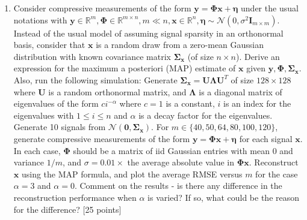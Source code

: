\documentclass[11pt]{article}
\begin{document}
\begin{enumerate}
\item Consider compressive measurements of the form $\boldsymbol{y} = \boldsymbol{\Phi x} + \boldsymbol{\eta}$ under the usual notations with $\boldsymbol{y} \in \mathbb{R}^m, \boldsymbol{\Phi} \in \mathbb{R}^{m \times n}, m \ll n, \boldsymbol{x} \in \mathbb{R}^n, \boldsymbol{\eta} \sim \mathcal{N}(0,\sigma^2\boldsymbol{I}_{m \times m})$. Instead of the usual model of assuming signal sparsity in an orthonormal basis, consider that $\boldsymbol{x}$ is a random draw from a zero-mean Gaussian distribution with known covariance matrix $\boldsymbol{\Sigma_x}$ (of size $n \times n$). Derive an expression for the maximum a posteriori (MAP) estimate of $\boldsymbol{x}$ given $\boldsymbol{y}, \boldsymbol{\Phi}, \boldsymbol{\Sigma_x}$. Also, run the following simulation:
Generate $\boldsymbol{\Sigma_x} = \boldsymbol{U \Lambda U}^T$ of size $128 \times 128$ where $\boldsymbol{U}$ is a random orthonormal matrix, and $\boldsymbol{\Lambda}$ is a diagonal matrix of eigenvalues of the form $c i^{-\alpha}$ where $c = 1$ is a constant, $i$ is an index for the eigenvalues with $1 \leq i \leq n$ and $\alpha$ is a decay factor for the eigenvalues. Generate 10 signals from $\mathcal{N}(\boldsymbol{0},\boldsymbol{\Sigma_x})$. For $m \in \{40,50,64,80,100,120\}$, generate compressive measurements of the form $\boldsymbol{y} = \boldsymbol{\Phi x} + \boldsymbol{\eta}$ for each signal $\boldsymbol{x}$. In each case, $\boldsymbol{\Phi}$ should be a matrix of iid Gaussian entries with mean 0 and variance $1/m$, and $\sigma = 0.01 \times$ the average absolute value in $\boldsymbol{\Phi x}$. Reconstruct $\boldsymbol{x}$ using the MAP formula, and plot the average RMSE versus $m$ for the case $\alpha = 3$ and $\alpha = 0$. Comment on the results - is there any difference in the reconstruction performance when $\alpha$ is varied? If so, what could be the reason for the difference? \textsf{[25 points]}


\end{enumerate}
\end{document}

